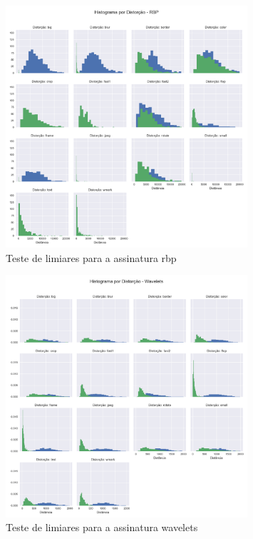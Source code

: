 \begin{figure}[h]
	\centering
	\label{fig:limiares-rbp}
	\caption{Teste de limiares para a assinatura rbp}
	\includegraphics[width=0.8\textwidth]{dados/figuras/experimentos/histograma_distorcao_RBP.png}
\end{figure}
\begin{figure}[h]
	\centering
	\label{fig:limiares-wavelets}
	\caption{Teste de limiares para a assinatura wavelets}
	\includegraphics[width=0.8\textwidth]{dados/figuras/experimentos/histograma_distorcao_Wavelets.png}
\end{figure}

